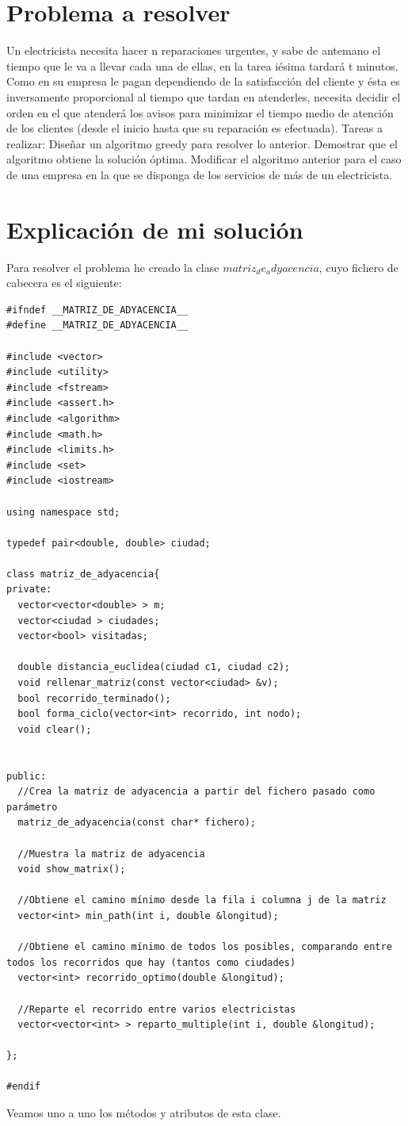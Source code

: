 \documentclass[12pt]{article}
\begin{document}
\section{Problema a resolver}
Un electricista necesita hacer n reparaciones urgentes, y sabe de antemano el tiempo que le va a llevar cada una de ellas, en la tarea iésima tardará t minutos. Como en su empresa le pagan dependiendo de la satisfacción del cliente y ésta es inversamente proporcional al tiempo que tardan en atenderles, necesita decidir el orden en el que atenderá los avisos para minimizar el tiempo medio de atención de los clientes (desde el inicio hasta que su reparación es efectuada). 
Tareas a realizar: Diseñar un algoritmo greedy para resolver lo anterior. Demostrar que el algoritmo obtiene la solución óptima. Modificar el algoritmo anterior para el caso de una empresa en la que se disponga de los servicios de más de un electricista.

\section{Explicación de mi solución}
Para resolver el problema he creado la clase $matriz_de_adyacencia$, cuyo fichero de cabecera es el siguiente: 

\begin{lstlisting}
#ifndef __MATRIZ_DE_ADYACENCIA__
#define __MATRIZ_DE_ADYACENCIA__

#include <vector>
#include <utility>
#include <fstream>
#include <assert.h>
#include <algorithm>
#include <math.h>
#include <limits.h>
#include <set>
#include <iostream>

using namespace std;

typedef pair<double, double> ciudad;

class matriz_de_adyacencia{
private:
  vector<vector<double> > m;
  vector<ciudad > ciudades;
  vector<bool> visitadas;

  double distancia_euclidea(ciudad c1, ciudad c2);
  void rellenar_matriz(const vector<ciudad> &v);
  bool recorrido_terminado();
  bool forma_ciclo(vector<int> recorrido, int nodo);
  void clear();


public:
  //Crea la matriz de adyacencia a partir del fichero pasado como parámetro
  matriz_de_adyacencia(const char* fichero);

  //Muestra la matriz de adyacencia
  void show_matrix();
  
  //Obtiene el camino mínimo desde la fila i columna j de la matriz
  vector<int> min_path(int i, double &longitud);

  //Obtiene el camino mínimo de todos los posibles, comparando entre todos los recorridos que hay (tantos como ciudades)
  vector<int> recorrido_optimo(double &longitud);

  //Reparte el recorrido entre varios electricistas
  vector<vector<int> > reparto_multiple(int i, double &longitud);

};

#endif
\end{lstlisting} 
Veamos uno a uno los métodos y atributos de esta clase.
\end{document}
